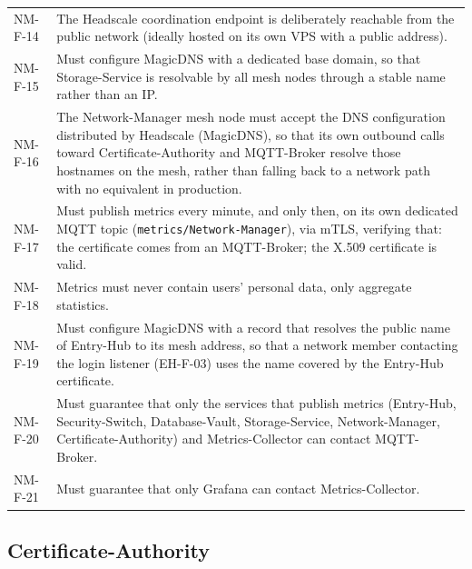 \begin{longtable}{p{2.6cm} p{\dimexpr\linewidth-2.6cm-4\tabcolsep\relax}}
NM-F-14 & The Headscale coordination endpoint is deliberately reachable from the public network (ideally hosted on its own VPS with a public address). \\
NM-F-15 & Must configure MagicDNS with a dedicated base domain, so that Storage-Service is resolvable by all mesh nodes through a stable name rather than an IP. \\
NM-F-16 & The Network-Manager mesh node must accept the DNS configuration distributed by Headscale (MagicDNS), so that its own outbound calls toward Certificate-Authority and MQTT-Broker resolve those hostnames on the mesh, rather than falling back to a network path with no equivalent in production. \\
NM-F-17 & Must publish metrics every minute, and only then, on its own dedicated MQTT topic (\texttt{metrics/Network-Manager}), via mTLS, verifying that: the certificate comes from an MQTT-Broker; the X.509 certificate is valid. \\
NM-F-18 & Metrics must never contain users' personal data, only aggregate statistics. \\
NM-F-19 & Must configure MagicDNS with a record that resolves the public name of Entry-Hub to its mesh address, so that a network member contacting the login listener (EH-F-03) uses the name covered by the Entry-Hub certificate. \\
NM-F-20 & Must guarantee that only the services that publish metrics (Entry-Hub, Security-Switch, Database-Vault, Storage-Service, Network-Manager, Certificate-Authority) and Metrics-Collector can contact MQTT-Broker. \\
NM-F-21 & Must guarantee that only Grafana can contact Metrics-Collector. \\
\end{longtable}

\subsection{Certificate-Authority}

